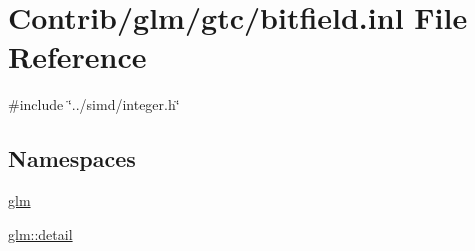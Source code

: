 \hypertarget{bitfield_8inl}{}\section{Contrib/glm/gtc/bitfield.inl File Reference}
\label{bitfield_8inl}
{\ttfamily \#include \char`\"{}../simd/integer.\+h\char`\"{}}\newline
\subsection*{Namespaces}
\begin{DoxyCompactItemize}
\item 
 \mbox{\hyperlink{namespaceglm}{glm}}
\item 
 \mbox{\hyperlink{namespaceglm_1_1detail}{glm\+::detail}}
\end{DoxyCompactItemize}
